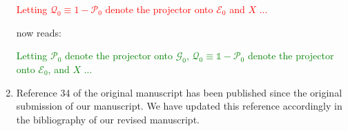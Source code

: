 \documentclass[preprint]{revtex4-1}
\newcommand{\E}{\mathcal{E}}
\newcommand{\G}{\mathcal{G}}
\renewcommand{\P}{\mathcal{P}}
\newcommand{\Q}{\mathcal{Q}}
\newcommand{\1}{\mathds{1}}
\newcommand{\red}[1]{\textcolor{red}{#1}}
\newcommand{\green}[1]{\textcolor{green}{#1}}
\begin{document}
\begin{enumerate}[label=(R3.\arabic*)]
  \red{Letting $\Q_0\equiv1-\P_0$ denote the projector onto $\E_0$ and
    $X$ ...}

  now reads:

  \green{Letting $\P_0$ denote the projector onto $\G_0$,
    $\Q_0\equiv\1-\P_0$ denote the projector onto $\E_0$, and $X$ ...}


\item Reference 34 of the original manuscript has been published since
  the original submission of our manuscript.  We have updated this
  reference accordingly in the bibliography of our revised manuscript.

\end{enumerate}
\end{document}
